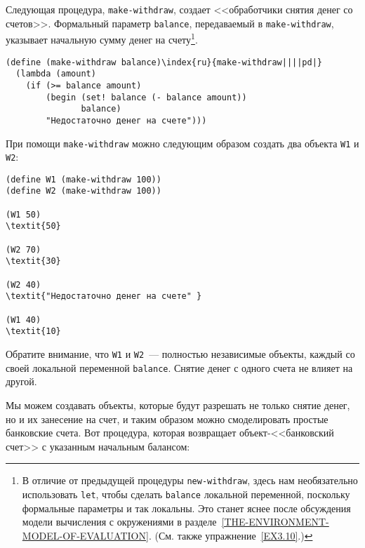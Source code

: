 Следующая процедура, {\tt make-withdraw}, создает
<<обработчики снятия денег со счетов>>.  Формальный параметр
{\tt balance}, передаваемый в {\tt make-withdraw},
указывает начальную сумму денег на счету\footnote{В отличие от предыдущей процедуры
{\tt new-withdraw}, здесь нам необязательно использовать
{\tt let},
чтобы сделать {\tt balance} локальной переменной, поскольку
формальные параметры и так локальны.  Это станет яснее после
обсуждения модели вычисления с окружениями в
разделе~\ref{THE-ENVIRONMENT-MODEL-OF-EVALUATION}. (См.
также упражнение~\ref{EX3.10}.)}.
{\sloppy

}

\begin{Verbatim}[fontsize=\small]
(define (make-withdraw balance)\index{ru}{make-withdraw||||pd|}
  (lambda (amount)
    (if (>= balance amount)
        (begin (set! balance (- balance amount))
               balance)
        "Недостаточно денег на счете")))
\end{Verbatim}
При помощи {\tt make-withdraw} можно следующим образом создать
два объекта {\tt W1} и {\tt W2}:

\begin{Verbatim}[fontsize=\small]
(define W1 (make-withdraw 100))
(define W2 (make-withdraw 100))

(W1 50)
\textit{50}

(W2 70)
\textit{30}

(W2 40)
\textit{"Недостаточно денег на счете" }

(W1 40)
\textit{10}
\end{Verbatim}
Обратите внимание, что
{\tt W1} и {\tt W2}~--- полностью независимые объекты,
каждый со своей локальной переменной {\tt balance}.  Снятие
денег с одного счета не влияет на другой.

Мы можем создавать объекты, которые будут разрешать не только
снятие денег, но и их занесение на счет, и таким образом можно
смоделировать простые банковские счета.  Вот процедура, которая
возвращает объект-<<банковский счет>> с указанным начальным балансом:

